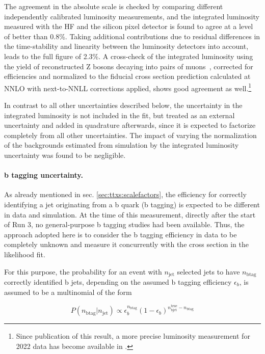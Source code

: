 The agreement in the absolute scale is checked by comparing different independently calibrated luminosity measurements, and the integrated luminosity measured with the HF and the silicon pixel detector is found to agree at a level of better than 0.8\%.
Taking additional contributions due to residual differences in the time-stability and linearity between the luminosity detectors into account, leads to the full figure of 2.3\%.
A cross-check of the integrated luminosity using the yield of reconstructed Z bosons decaying into pairs of muons~\cite{CMS:DP-2023-003}, corrected for efficiencies and normalized to the fiducial cross section prediction calculated at NNLO with next-to-NNLL corrections applied, shows good agreement as well.\footnote{Since publication of this result, a more precise luminosity measurement for 2022 data has become available in .}

In contrast to all other uncertainties described below, the uncertainty in the integrated luminosity is not included in the fit, but treated as an external uncertainty and added in quadrature afterwards, since it is expected to factorize completely from all other uncertainties.
The impact of varying the normalization of the backgrounds estimated from simulation by the integrated luminosity uncertainty was found to be negligible.

\paragraph{b tagging uncertainty.}

As already mentioned in sec. \ref{sec:ttxs:scalefactors}, the efficiency for correctly identifying a jet originating from a b quark (b tagging) is expected to be different in data and simulation. At the time of this measurement, directly after the start of Run 3, no general-purpose b tagging studies had been available. Thus, the approach adopted here is to consider the b tagging efficiency in data to be completely unknown and measure it concurrently with the cross section in the likelihood fit.

For this purpose, the probability for an event with $n_{\mathrm{jet}}$ selected jets to have $n_{\mathrm{b tag}}$ correctly identified b jets, depending on the assumed b tagging efficiency $\epsilon_b$, is assumed to be a multinomial of the form

\begin{equation}
\label{eq:ttxs:btags}
    P (n_{\mathrm{b tag}} | n_{\mathrm{jet}}) \propto \epsilon_b^{n_{\mathrm{b tag}}} (1 - \epsilon_b)^{n_{\mathrm{b jet}}^{\mathrm{true}} - n_{\mathrm{b tag}}}
\end{equation}

